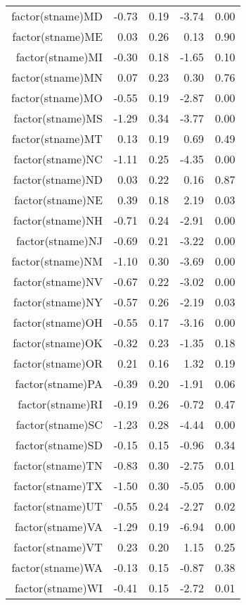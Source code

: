 \begin{table}[ht]
\begin{tabular}{rrrrr}
  factor(stname)MD & -0.73 & 0.19 & -3.74 & 0.00 \\ 
  factor(stname)ME & 0.03 & 0.26 & 0.13 & 0.90 \\ 
  factor(stname)MI & -0.30 & 0.18 & -1.65 & 0.10 \\ 
  factor(stname)MN & 0.07 & 0.23 & 0.30 & 0.76 \\ 
  factor(stname)MO & -0.55 & 0.19 & -2.87 & 0.00 \\ 
  factor(stname)MS & -1.29 & 0.34 & -3.77 & 0.00 \\ 
  factor(stname)MT & 0.13 & 0.19 & 0.69 & 0.49 \\ 
  factor(stname)NC & -1.11 & 0.25 & -4.35 & 0.00 \\ 
  factor(stname)ND & 0.03 & 0.22 & 0.16 & 0.87 \\ 
  factor(stname)NE & 0.39 & 0.18 & 2.19 & 0.03 \\ 
  factor(stname)NH & -0.71 & 0.24 & -2.91 & 0.00 \\ 
  factor(stname)NJ & -0.69 & 0.21 & -3.22 & 0.00 \\ 
  factor(stname)NM & -1.10 & 0.30 & -3.69 & 0.00 \\ 
  factor(stname)NV & -0.67 & 0.22 & -3.02 & 0.00 \\ 
  factor(stname)NY & -0.57 & 0.26 & -2.19 & 0.03 \\ 
  factor(stname)OH & -0.55 & 0.17 & -3.16 & 0.00 \\ 
  factor(stname)OK & -0.32 & 0.23 & -1.35 & 0.18 \\ 
  factor(stname)OR & 0.21 & 0.16 & 1.32 & 0.19 \\ 
  factor(stname)PA & -0.39 & 0.20 & -1.91 & 0.06 \\ 
  factor(stname)RI & -0.19 & 0.26 & -0.72 & 0.47 \\ 
  factor(stname)SC & -1.23 & 0.28 & -4.44 & 0.00 \\ 
  factor(stname)SD & -0.15 & 0.15 & -0.96 & 0.34 \\ 
  factor(stname)TN & -0.83 & 0.30 & -2.75 & 0.01 \\ 
  factor(stname)TX & -1.50 & 0.30 & -5.05 & 0.00 \\ 
  factor(stname)UT & -0.55 & 0.24 & -2.27 & 0.02 \\ 
  factor(stname)VA & -1.29 & 0.19 & -6.94 & 0.00 \\ 
  factor(stname)VT & 0.23 & 0.20 & 1.15 & 0.25 \\ 
  factor(stname)WA & -0.13 & 0.15 & -0.87 & 0.38 \\ 
  factor(stname)WI & -0.41 & 0.15 & -2.72 & 0.01 \\ 

\end{tabular}
\end{table}
